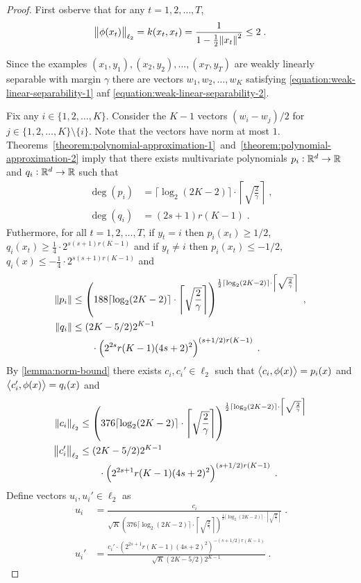 \begin{proof}
First osberve that for any $t=1,2,\dots,T$,
$$
\norm{\phi(x_t)}_{\ell_2} = k(x_t,x_t) = \frac{1}{1 - \frac{1}{2} \norm{x_t}^2} \le 2 \; .
$$

Since the examples $(x_1, y_1), (x_2, y_2), \dots, (x_T, y_T)$ are weakly
linearly separable with margin $\gamma$ there are vectors $w_1, w_2, \dots, w_K$
satisfying \eqref{equation:weak-linear-separability-1} anf
\eqref{equation:weak-linear-separability-2}.

Fix any $i \in \{1,2,\dots,K\}$. Consider the $K-1$ vectors $(w_i - w_j)/2$ for
$j \in \{1,2,\dots,K\} \setminus \{i\}$. Note that the vectors have norm at most
$1$.
Theorems~\ref{theorem:polynomial-approximation-1}~and~\ref{theorem:polynomial-approximation-2}
imply that there exists multivariate polynomials $p_i:\mathbb{R}^d \to \mathbb{R}$ and $q_i:\mathbb{R}^d
\to \mathbb{R}$ such that
\begin{align*}
\deg(p_i) & = \lceil \log_2(2K-2) \rceil \cdot \left\lceil \sqrt{\frac{2}{\gamma}} \right\rceil \; , \\
\deg(q_i) & = (2s+1) r(K-1) \; .
\end{align*}
Futhermore, for all $t=1,2,\dots,T$, if $y_t = i$ then $p_i(x_t) \ge 1/2$,
$q_i(x_t) \ge \frac{1}{4} \cdot 2^{s(s+1)r(K-1)}$ and if $y_t \neq i$ then
$p_i(x_t) \le -1/2$, $q_i(x) \le - \frac{1}{4} \cdot 2^{s(s+1)r(K-1)}$ and
\begin{align*}
\norm{p_i} & \le \left(188 \lceil \log_2(2K-2) \rceil \cdot \left \lceil \sqrt{\frac{2}{\gamma}} \right \rceil \right)^{\frac{1}{2} \lceil \log_2(2K-2) \rceil
\cdot \left \lceil \sqrt{\frac{2}{\gamma}} \right \rceil} \; , \\
\norm{q_i} & \le (2K-5/2) 2^{K-1} \\
& \qquad \cdot \left(2^{2s} r(K-1) (4s+2)^2 \right)^{(s+1/2)r(K-1)} \; .
\end{align*}
By \autoref{lemma:norm-bound} there exists $c_i, c_i' \in \ell_2$ such that
$\left\langle c_i, \phi(x) \right\rangle = p_i(x)$ and $\left\langle c_i', \phi(x) \right\rangle = q_i(x)$ and
\begin{align*}
\norm{c_i}_{\ell_2}
& \le \left(376 \lceil \log_2(2K-2) \rceil \cdot \left \lceil \sqrt{\frac{2}{\gamma}} \right \rceil \right)^{\frac{1}{2} \lceil \log_2(2K-2) \rceil
\cdot \left \lceil \sqrt{\frac{2}{\gamma}} \right \rceil} \\
\norm{c'_i}_{\ell_2} & \le (2K-5/2) 2^{K-1} \\
& \qquad \cdot \left(2^{2s+1} r(K-1) (4s+2)^2 \right)^{(s+1/2)r(K-1)} \; .
\end{align*}
Define vectors $u_i, u_i' \in \ell_2$ as
\begin{align*}
u_i & = \frac{c_i}{\sqrt{K} \left(376 \lceil \log_2(2K-2) \rceil \cdot \left \lceil \sqrt{\frac{2}{\gamma}} \right \rceil \right)^{\frac{1}{2} \lceil \log_2(2K-2) \rceil
\cdot \left \lceil \sqrt{\frac{2}{\gamma}} \right \rceil}} \; . \\
u_i' & = \frac{c_i'  \cdot \left(2^{2s+1} r(K-1) (4s+2)^2 \right)^{-(s+1/2)r(K-1)}}{\sqrt{K} (2K-5/2) 2^{K-1}} \; .
\end{align*}


\end{proof}
